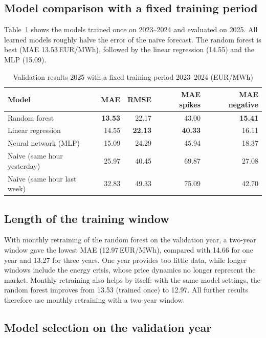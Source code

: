 \documentclass[12pt,oneside]{article}
\begin{document}
\subsection{Model comparison with a fixed training period}

Table~\ref{tab:valfixed} shows the models trained once on 2023--2024 and evaluated on 2025. All learned models roughly halve the error of the naive forecast. The random forest is best (MAE 13.53\,EUR/MWh), followed by the linear regression (14.55) and the MLP (15.09).

\begin{table}[!htbp]
    \centering
    \caption{Validation results 2025 with a fixed training period 2023--2024 (EUR/MWh)}
    \begin{tabular}{lrrrr}
        \toprule
        Model & MAE & RMSE & MAE spikes & MAE negative \\
        \midrule
        Random forest & \textbf{13.53} & 22.17 & 43.00 & \textbf{15.41} \\
        Linear regression & 14.55 & \textbf{22.13} & \textbf{40.33} & 16.11 \\
        Neural network (MLP) & 15.09 & 24.29 & 45.94 & 18.37 \\
        Naive (same hour yesterday) & 25.97 & 40.45 & 69.87 & 27.08 \\
        Naive (same hour last week) & 32.83 & 49.33 & 75.09 & 42.70 \\
        \bottomrule
    \end{tabular}
    \label{tab:valfixed}
\end{table}

\subsection{Length of the training window} \label{sec:window}

With monthly retraining of the random forest on the validation year, a two-year window gave the lowest MAE (12.97\,EUR/MWh), compared with 14.66 for one year and 13.27 for three years. One year provides too little data, while longer windows include the energy crisis, whose price dynamics no longer represent the market. Monthly retraining also helps by itself: with the same model settings, the random forest improves from 13.53 (trained once) to 12.97. All further results therefore use monthly retraining with a two-year window.

\subsection{Model selection on the validation year}
\end{document}

